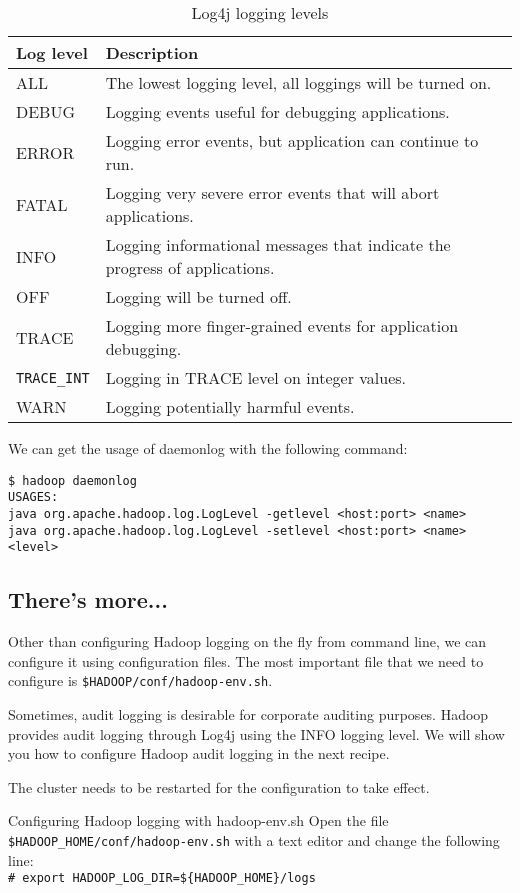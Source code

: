 \begin{table}
  \begin{tabular}{ll}
    \toprule 
    \textbf{Log level} & \textbf{Description} \\ \midrule
    ALL & The lowest logging level, all loggings will be turned on. \\
    DEBUG & Logging events useful for debugging applications.\\
    ERROR & Logging error events, but application can continue to run. \\
    FATAL & Logging very severe error events that will abort applications. \\
    INFO & Logging informational messages that indicate the progress of applications. \\
    OFF & Logging will be turned off. \\
    TRACE & Logging more finger-grained events for application debugging. \\
    \verb|TRACE_INT| & Logging in TRACE level on integer values. \\
    WARN & Logging potentially harmful events. \\ \bottomrule
  \end{tabular}
  \caption{Log4j logging levels}\label{tbl:log4j}
\end{table}

We can get the usage of daemonlog with the following command:
\begin{verbatim}
$ hadoop daemonlog
USAGES:
java org.apache.hadoop.log.LogLevel -getlevel <host:port> <name>
java org.apache.hadoop.log.LogLevel -setlevel <host:port> <name> <level>
\end{verbatim}

\subsection*{There's more...}
Other than configuring Hadoop logging on the fly from command line, we can configure it using configuration files. The most important file that we need to configure is \verb|$HADOOP/conf/hadoop-env.sh|.

Sometimes, audit logging is desirable for corporate auditing purposes. Hadoop provides audit logging through Log4j using the INFO logging level. We will show you how to configure Hadoop audit logging in the next recipe.

The cluster needs to be restarted for the configuration to take effect.

Configuring Hadoop logging with hadoop-env.sh
Open the file \verb|$HADOOP_HOME/conf/hadoop-env.sh| with a text editor and change the following line: \\
\verb|# export HADOOP_LOG_DIR=${HADOOP_HOME}/logs|

